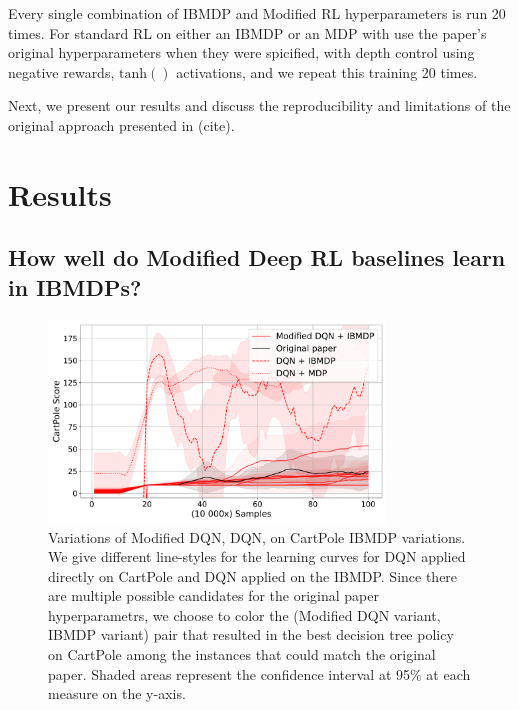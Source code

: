 Every single combination of IBMDP and Modified RL hyperparameters is run 20 times.
For standard RL on either an IBMDP or an MDP with use the paper's original hyperparameters when they were spicified, with depth control using negative rewards, $\operatorname{tanh()}$ activations, and we repeat this training 20 times. 

Next, we present our results and discuss the reproducibility and limitations of the original approach presented in (cite).

\section{Results}

\subsection{How well do Modified Deep RL baselines learn in IBMDPs?}

\begin{figure}
    \centering
    \includegraphics[width=0.8\textwidth]{images/images_part1/dqn.pdf}
    \caption{Variations of Modified DQN, DQN, on CartPole IBMDP variations. We give different line-styles for the learning curves for DQN applied directly on CartPole and DQN applied on the IBMDP.
    Since there are multiple possible candidates for the original paper hyperparametrs, we choose to color the (Modified DQN variant, IBMDP variant) pair that resulted in the best decision tree policy on CartPole among the instances that could match the original paper.
    Shaded areas represent the confidence interval at 95\% at each measure on the y-axis.}
\end{figure}

